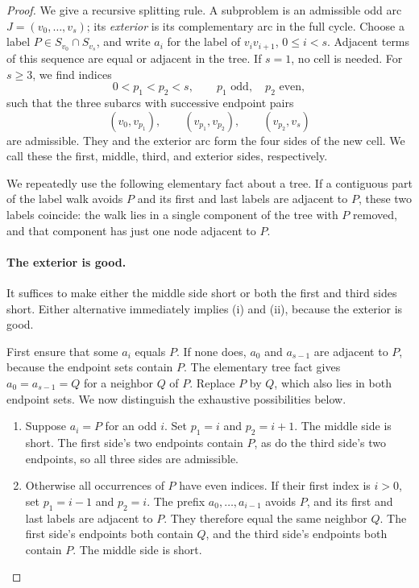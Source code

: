 \documentclass[11pt]{article}
\theoremstyle{definition}
\theoremstyle{remark}
\numberwithin{equation}{section}
\begin{document}
\begin{proof}
We give a recursive splitting rule.  A subproblem is an admissible odd
arc $J=(v_0,\ldots,v_s)$; its \emph{exterior} is its complementary arc
in the full cycle.  Choose a label $P\in S_{v_0}\cap S_{v_s}$, and
write $a_i$ for the label of $v_iv_{i+1}$, $0\le i<s$.
Adjacent terms of this sequence are equal or adjacent in the tree.
If $s=1$, no cell is needed.  For $s\ge3$, we find indices
\begin{equation}
\label{eq:cell-split-indices}
 0<p_1<p_2<s,\qquad p_1\text{ odd},\quad p_2\text{ even},
\end{equation}
such that the three subarcs with successive endpoint pairs
\[
 (v_0,v_{p_1}),\qquad (v_{p_1},v_{p_2}),\qquad
 (v_{p_2},v_s)
\]
are admissible.  They and the exterior arc form the four sides of the
new cell.  We call these the first, middle, third, and exterior sides,
respectively.

We repeatedly use the following elementary fact about a tree.
If a contiguous part of the label walk avoids $P$ and its first and
last labels are adjacent to $P$, these two labels coincide: the walk
lies in a single component of the tree with $P$ removed, and that
component has just one node adjacent to $P$.

\paragraph{The exterior is good.}
It suffices to make either the middle side short or both the first and
third sides short.  Either alternative immediately implies
\textup{(i)} and \textup{(ii)}, because the exterior is good.

First ensure that some $a_i$ equals $P$.  If none does, $a_0$ and
$a_{s-1}$ are adjacent to $P$, because the endpoint sets contain $P$.
The elementary tree fact gives $a_0=a_{s-1}=Q$ for a neighbor $Q$ of
$P$.  Replace $P$ by $Q$, which also lies in both endpoint sets.
We now distinguish the exhaustive possibilities below.
\begin{enumerate}[label=\textup{(\alph*)}]
 \item Suppose $a_i=P$ for an odd $i$.
 Set $p_1=i$ and $p_2=i+1$.  The middle side is short.  The first
 side's two endpoints contain $P$, as do the third side's two
 endpoints, so all three sides are admissible.

 \item Otherwise all occurrences of $P$ have even indices.
 If their first index is $i>0$, set $p_1=i-1$ and $p_2=i$.
 The prefix $a_0,\ldots,a_{i-1}$ avoids $P$, and its first and last
 labels are adjacent to $P$.  They therefore equal the same neighbor
 $Q$.  The first side's endpoints both contain $Q$, and the third
 side's endpoints both contain $P$.  The middle side is short.


\end{enumerate}
\end{proof}
\end{document}
